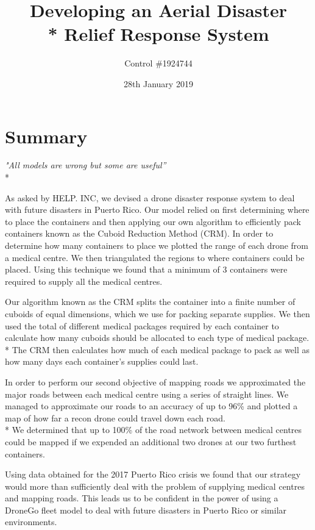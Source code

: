 \documentclass[a4paper,12pt]{article}
\begin{document}
\title{Developing an Aerial Disaster \\* Relief Response System}
\author{Control \#1924744}
\date{28th January 2019}
\maketitle
\newpage


\pagestyle{style2}

\section*{\hfil Summary\hfil}
\begin{center}
\textit{"All models are wrong but some are useful''} \\*
\end{center}
As asked by HELP. INC, we devised a drone disaster response system to deal with future disasters in Puerto Rico.
Our model relied on first determining where to place the containers and then applying our own algorithm to efficiently pack containers known as the Cuboid Reduction Method (CRM).
In order to determine how many containers to place we plotted the range of each drone from a medical centre. We then triangulated the regions to where containers could be placed.
Using this technique we found that a minimum of 3 containers were required to supply all the medical centres. 

Our algorithm known as the CRM splits the container into a finite number of cuboids of equal dimensions, which we use for packing separate supplies.
We then used the total of different medical packages required by each container to calculate how many cuboids should be allocated to each type of medical package.\\*
The CRM then calculates how much of each medical package to pack as well as how many days each container's supplies could last.

In order to perform our second objective of mapping roads we approximated the major roads between each medical centre using a series of straight lines.
We managed to approximate our roads to an accuracy of up to 96\% and plotted a map of how far a recon drone could travel down each road.\\* We determined that up to 100\% of the road network between medical centres
could be mapped if we expended an additional two drones at our two furthest containers. 

Using data obtained for the 2017 Puerto Rico crisis we found that our strategy would more than sufficiently deal with the problem of supplying medical centres and mapping roads. This leads us to be confident in the
power of using a DroneGo fleet model to deal with future disasters in Puerto Rico or similar environments.
\end{document}
